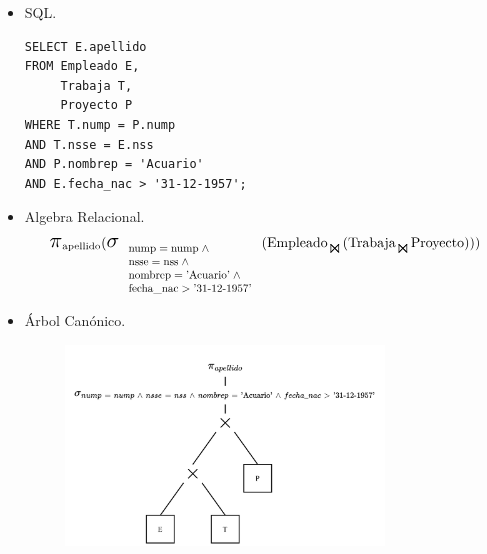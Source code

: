 \documentclass{templateNote}
\begin{document}
\begin{itemize}
    \item SQL.
    \begin{verbatim}
SELECT E.apellido
FROM Empleado E,
     Trabaja T,
     Proyecto P
WHERE T.nump = P.nump
AND T.nsse = E.nss
AND P.nombrep = 'Acuario'
AND E.fecha_nac > '31-12-1957';
    \end{verbatim}

    \item Algebra Relacional.
    \begin{align*}
        \scalebox{1.5}{$\pi$}_{\text{apellido}} (
            \scalebox{1.5}{$\sigma$}_{
                \scalebox{0.8}{
                    $\begin{array}{l}
                        \text{nump} = \text{nump} \; \wedge \\
                        \text{nsse} = \text{nss} \; \wedge \\
                        \text{nombrep} = \text{'Acuario'} \; \wedge \\
                        \text{fecha\_nac} > \text{'31-12-1957'}
                    \end{array}$
                }
            } (
                \text{Empleado}_{\scalebox{1.3}{$\Join$}} (
                    \text{Trabaja}_{\scalebox{1.3}{$\Join$}} \text{Proyecto}
                )
            )
        )
    \end{align*}

    \newpage
    \item \'Arbol Can\'onico.
    \begin{figure}[H]
        \centering
        \includegraphics[width=0.8\textwidth]{img/E5-Canonico.png}
    \end{figure}


\end{itemize}
\end{document}

